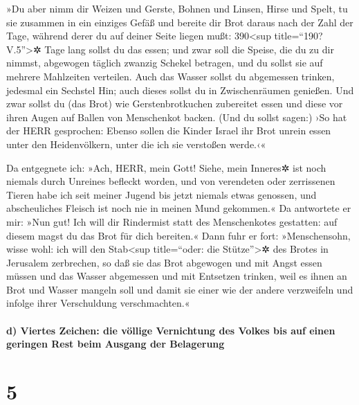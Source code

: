 »Du aber nimm dir Weizen und Gerste, Bohnen und Linsen,
Hirse und Spelt, tu sie zusammen in ein einziges Gefäß und bereite dir
Brot daraus nach der Zahl der Tage, während derer du auf deiner Seite
liegen mußt: 390\textless sup title=``190? V.5''\textgreater✲ Tage lang
sollst du das essen; und zwar soll die Speise, die du zu
dir nimmst, abgewogen täglich zwanzig Schekel betragen, und du sollst
sie auf mehrere Mahlzeiten verteilen. Auch das Wasser
sollst du abgemessen trinken, jedesmal ein Sechstel Hin; auch dieses
sollst du in Zwischenräumen genießen. Und zwar sollst du
(das Brot) wie Gerstenbrotkuchen zubereitet essen und diese vor ihren
Augen auf Ballen von Menschenkot backen. (Und du sollst
sagen:) ›So hat der HERR gesprochen: Ebenso sollen die Kinder Israel ihr
Brot unrein essen unter den Heidenvölkern, unter die ich sie verstoßen
werde.‹«

Da entgegnete ich: »Ach, HERR, mein Gott! Siehe, mein
Inneres✲ ist noch niemals durch Unreines befleckt worden, und von
verendeten oder zerrissenen Tieren habe ich seit meiner Jugend bis jetzt
niemals etwas genossen, und abscheuliches Fleisch ist noch nie in meinen
Mund gekommen.« Da antwortete er mir: »Nun gut! Ich will
dir Rindermist statt des Menschenkotes gestatten: auf diesem magst du
das Brot für dich bereiten.« Dann fuhr er fort:
»Menschensohn, wisse wohl: ich will den Stab\textless sup title=``oder:
die Stütze''\textgreater✲ des Brotes in Jerusalem zerbrechen, so daß sie
das Brot abgewogen und mit Angst essen müssen und das Wasser abgemessen
und mit Entsetzen trinken, weil es ihnen an Brot und
Wasser mangeln soll und damit sie einer wie der andere verzweifeln und
infolge ihrer Verschuldung verschmachten.«

\hypertarget{d-viertes-zeichen-die-vuxf6llige-vernichtung-des-volkes-bis-auf-einen-geringen-rest-beim-ausgang-der-belagerung}{%
\paragraph{d) Viertes Zeichen: die völlige Vernichtung des Volkes bis
auf einen geringen Rest beim Ausgang der
Belagerung}\label{d-viertes-zeichen-die-vuxf6llige-vernichtung-des-volkes-bis-auf-einen-geringen-rest-beim-ausgang-der-belagerung}}

\hypertarget{section-4}{%
\section{5}\label{section-4}}

